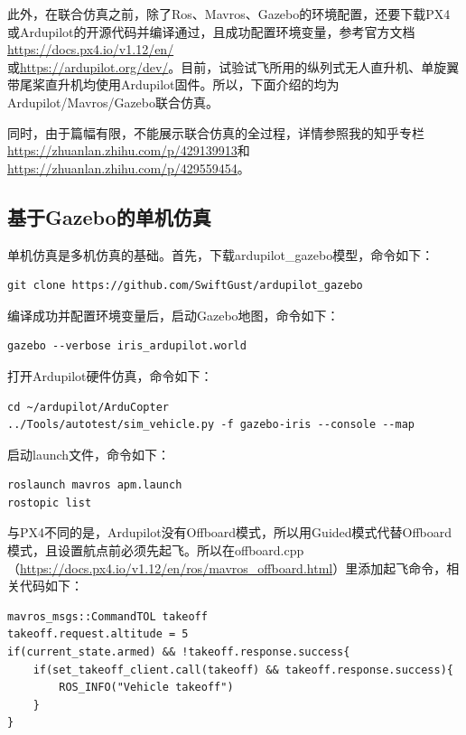 此外，在联合仿真之前，除了Ros、Mavros、Gazebo的环境配置，还要下载PX4或Ardupilot的开源代码并编译通过，且成功配置环境变量，参考官方文档\href{https://docs.px4.io/v1.12/en/}{https://docs.px4.io/v1.12/en/}\\
或\href{https://ardupilot.org/dev/}{https://ardupilot.org/dev/}。目前，试验试飞所用的纵列式无人直升机、单旋翼带尾桨直升机均使用Ardupilot固件。所以，下面介绍的均为Ardupilot/Mavros/Gazebo联合仿真。

同时，由于篇幅有限，不能展示联合仿真的全过程，详情参照我的知乎专栏\\
\href{https://zhuanlan.zhihu.com/p/429139913}{https://zhuanlan.zhihu.com/p/429139913}和\href{https://zhuanlan.zhihu.com/p/429559454}{https://zhuanlan.zhihu.com/p/429559454}。

\subsection{基于Gazebo的单机仿真}
单机仿真是多机仿真的基础。首先，下载ardupilot\_gazebo模型，命令如下：
\begin{lstlisting}[style = lstStyleBase]
git clone https://github.com/SwiftGust/ardupilot_gazebo
\end{lstlisting}

编译成功并配置环境变量后，启动Gazebo地图，命令如下：
\begin{lstlisting}[style = lstStyleBase]
gazebo --verbose iris_ardupilot.world
\end{lstlisting}

打开Ardupilot硬件仿真，命令如下：
\begin{lstlisting}[style = lstStyleBase]
cd ~/ardupilot/ArduCopter
../Tools/autotest/sim_vehicle.py -f gazebo-iris --console --map
\end{lstlisting}

启动launch文件，命令如下：
\begin{lstlisting}[style = lstStyleBase]
roslaunch mavros apm.launch
rostopic list
\end{lstlisting}

与PX4不同的是，Ardupilot没有Offboard模式，所以用Guided模式代替Offboard模式，且设置航点前必须先起飞。所以在offboard.cpp（\href{https://docs.px4.io/v1.12/en/ros/mavros_offboard.html}{https://docs.px4.io/v1.12/en/ros/mavros\_offboard.html}）里添加起飞命令，相关代码如下：
\begin{lstlisting}[style = lstStyleBase]
mavros_msgs::CommandTOL takeoff
takeoff.request.altitude = 5
if(current_state.armed) && !takeoff.response.success{
    if(set_takeoff_client.call(takeoff) && takeoff.response.success){
        ROS_INFO("Vehicle takeoff")
    }
}
\end{lstlisting}

